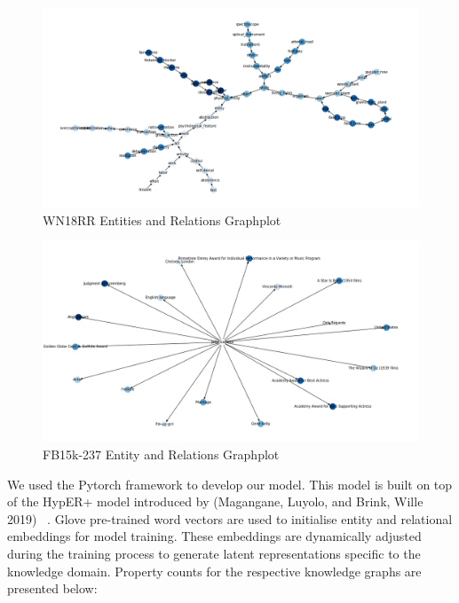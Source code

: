 \begin{figure}[H]
  	\caption{WN18RR Entities and Relations Graphplot}
   	\centering
    	\includegraphics[width=\textwidth]{WN18RR_Graph}
\end{figure}

\begin{figure}[H]
  	\caption{FB15k-237 Entity and Relations Graphplot}
   	\centering
    	\includegraphics[width=\textwidth]{FB15k-237_Graph}
\end{figure}

We used the Pytorch framework to develop our model. This model is built on top of the HypER+ model introduced by (Magangane, Luyolo, and Brink, Wille 2019) ~\citep{magangane2019hyperplus}.  Glove pre-trained word vectors are used to initialise entity and relational embeddings for model training. These embeddings are dynamically adjusted during the training process to generate latent representations specific to the knowledge domain. Property counts for the respective knowledge graphs are presented below:

